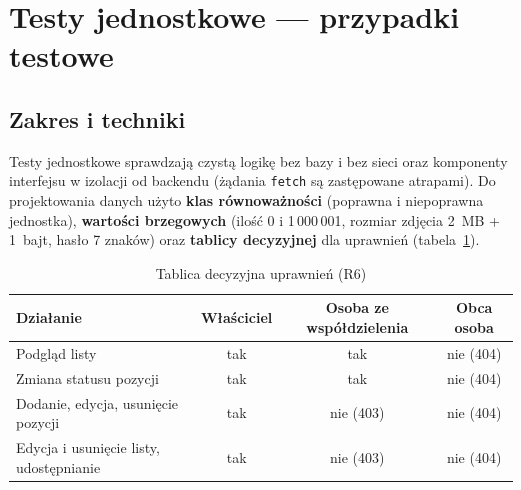 \documentclass[a4paper,11pt]{article}
\newcommand{\code}[1]{\texttt{\small #1}}
\begin{document}
\section{Testy jednostkowe — przypadki testowe}

\subsection{Zakres i techniki}
Testy jednostkowe sprawdzają czystą logikę bez bazy i bez sieci oraz komponenty interfejsu
w izolacji od backendu (żądania \code{fetch} są zastępowane atrapami). Do projektowania danych
użyto \textbf{klas równoważności} (poprawna i niepoprawna jednostka), \textbf{wartości
brzegowych} (ilość 0 i 1\,000\,001, rozmiar zdjęcia 2~MB + 1~bajt, hasło 7 znaków) oraz
\textbf{tablicy decyzyjnej} dla uprawnień (tabela~\ref{tab:uprawnienia}).

\begin{table}[H]
\centering\small
\begin{tabular}{@{}lccc@{}}
\toprule
\textsf{\textbf{Działanie}} & \textsf{\textbf{Właściciel}} & \textsf{\textbf{Osoba ze współdzielenia}} & \textsf{\textbf{Obca osoba}}\\
\midrule
Podgląd listy & tak & tak & nie (404)\\
Zmiana statusu pozycji & tak & tak & nie (404)\\
Dodanie, edycja, usunięcie pozycji & tak & nie (403) & nie (404)\\
Edycja i usunięcie listy, udostępnianie & tak & nie (403) & nie (404)\\
\bottomrule
\end{tabular}
\caption{Tablica decyzyjna uprawnień (R6)}
\label{tab:uprawnienia}
\end{table}
\end{document}
